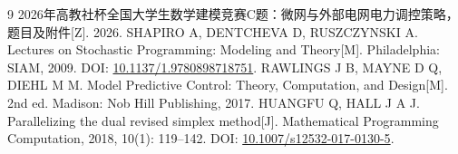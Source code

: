 \begin{thebibliography}{9}
 2026年高教社杯全国大学生数学建模竞赛C题：微网与外部电网电力调控策略，题目及附件[Z]. 2026.
 SHAPIRO A, DENTCHEVA D, RUSZCZYNSKI A. Lectures on Stochastic Programming: Modeling and Theory[M]. Philadelphia: SIAM, 2009. DOI: \href{https://doi.org/10.1137/1.9780898718751}{10.1137/1.9780898718751}.
 RAWLINGS J B, MAYNE D Q, DIEHL M M. Model Predictive Control: Theory, Computation, and Design[M]. 2nd ed. Madison: Nob Hill Publishing, 2017.
 HUANGFU Q, HALL J A J. Parallelizing the dual revised simplex method[J]. Mathematical Programming Computation, 2018, 10(1): 119--142. DOI: \href{https://doi.org/10.1007/s12532-017-0130-5}{10.1007/s12532-017-0130-5}.
\end{thebibliography}
